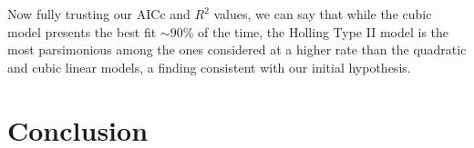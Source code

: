 \documentclass[11pt]{article}
\begin{document}
  Now fully trusting our AICc and $R^2$ values, we can say that while the cubic model presents the best fit $\sim90\%$ of the time, the Holling Type II model is the most parsimonious among the ones considered at a higher rate than the quadratic and cubic linear models, a finding consistent with our initial hypothesis. 
  
  \section{Conclusion}

  
  
\end{document}
